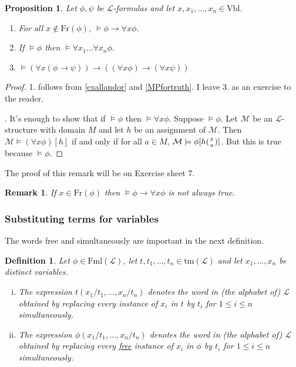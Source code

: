 \documentclass[11pt]{article}
\newcommand{\tm}{\textrm{tm}}
\newcommand{\Fml}{\textrm{Fml}}
\newcommand{\Fr}{\textrm{Fr}}
\newcommand{\Vbl}{\textrm{Vbl}}
\newtheorem{remark}[theorem]{Remark}
\newtheorem{proposition}[theorem]{Proposition}
\newtheorem{definition}[theorem]{Definition}
\newcommand{\mcal}[1]{\mathcal{#1}}
\begin{document}
\begin{proposition}\label{Axgentrueplus}
Let $\phi,\psi$ be $\mcal{L}$-formulas and let $x, x_1,\ldots, x_n\in\Vbl$.
\begin{enumerate}
\item  For all $x\notin \Fr(\phi)$, $\models \phi\rightarrow \forall x \phi$.
\item If $\models \phi$ then $\models \forall x_1\ldots \forall x_n \phi$.
\item $\models (\forall x (\phi\rightarrow \psi))\rightarrow ((\forall x\phi)\rightarrow (\forall x \psi))$
\end{enumerate}
\end{proposition}
\begin{proof}
1. follows from \ref{exallandor} and \ref{MPfortruth}. I leave 3. as an exercise to the reader.

\smallskip

. It's enough to show that if $\models \phi$ then $\models\forall x \phi$. Suppose $\models \phi$. Let $\mcal{M}$ be an $\mcal{L}$-structure with domain $M$ and let $h$ be an assignment of $\mcal{M}$. Then $\mcal{M}\models (\forall x \phi)[h]$ if and only if for all $a\in M$, $\mcal{M}\models \phi[h({x\atop a})]$. But this is true because $\models \phi$.
\end{proof}

The proof of this remark will be on Exercise sheet 7.
\begin{remark}
If $x\in \Fr(\phi)$ then $\models \phi\rightarrow \forall x \phi$ is not always true.
\end{remark}

\subsubsection*{Substituting terms for variables}

The words free and simultaneously are important in the next definition.

\begin{definition}
Let $\phi\in\Fml(\mcal{L})$, let $t,t_1,\ldots,t_n\in\tm(\mcal{L})$ and let $x_1,\ldots,x_n$ be distinct variables.
\begin{enumerate}[(i)]
\item The expression $t(x_1/t_1,\ldots,x_n/t_n)$ denotes the word in (the alphabet of) $\mcal{L}$ obtained by replacing every instance of $x_i$ in $t$ by $t_i$ for $1\leq i\leq n$ simultaneously.
\item The expression $\phi(x_1/t_1,\ldots,x_n/t_n)$ denotes the word in (the alphabet of) $\mcal{L}$ obtained by replacing every \underline{free} instance of $x_i$ in $\phi$ by $t_i$ for $1\leq i\leq n$ simultaneously.
\end{enumerate}
\end{definition}
\end{document}
